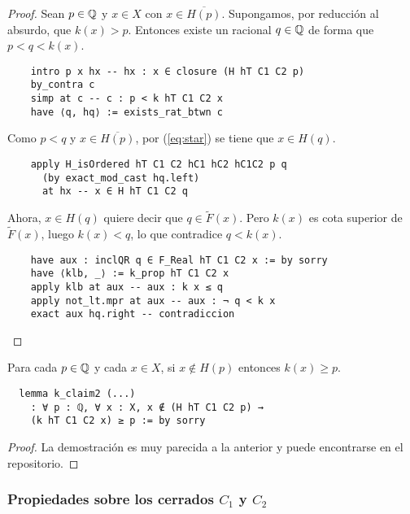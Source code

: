 \begin{proof}
  Sean $p \in \mathbb{Q}$ y $x \in X$ con $x \in \overline{H(p)}$. Supongamos, por reducción al absurdo, que $k(x) > p$. Entonces existe un racional $q \in \mathbb{Q}$ de forma que $p < q < k(x)$.

  \begin{lstlisting}
    intro p x hx -- hx : x ∈ closure (H hT C1 C2 p)
    by_contra c
    simp at c -- c : p < k hT C1 C2 x
    have ⟨q, hq⟩ := exists_rat_btwn c \end{lstlisting}

  Como $p < q$ y $x \in \overline{H(p)}$, por (\ref{eq:star}) se tiene que $x \in H(q)$. 

  \begin{lstlisting}
    apply H_isOrdered hT C1 C2 hC1 hC2 hC1C2 p q
      (by exact_mod_cast hq.left)
      at hx -- x ∈ H hT C1 C2 q \end{lstlisting}

  Ahora, $x \in H(q)$ quiere decir que $q \in \tilde{F}(x)$. Pero $k(x)$ es cota superior de $\tilde{F}(x)$, luego $k(x) < q$, lo que contradice $q < k(x)$.

  \begin{lstlisting}
    have aux : inclQR q ∈ F_Real hT C1 C2 x := by sorry
    have ⟨klb, _⟩ := k_prop hT C1 C2 x
    apply klb at aux -- aux : k x ≤ q
    apply not_lt.mpr at aux -- aux : ¬ q < k x
    exact aux hq.right -- contradiccion\end{lstlisting}
\end{proof}

\begin{lemma}\label{claim2}
  Para cada $p \in \mathbb{Q}$ y cada $x \in X$, si $x \notin H(p)$ entonces $k(x) \geq p$.
\end{lemma}

\begin{lstlisting}
  lemma k_claim2 (...)
    : ∀ p : ℚ, ∀ x : X, x ∉ (H hT C1 C2 p) →
    (k hT C1 C2 x) ≥ p := by sorry
\end{lstlisting}

\begin{proof}
  La demostración es muy parecida a la anterior y puede encontrarse en el repositorio.
\end{proof}

\subsubsection{Propiedades sobre los cerrados $C_1$ y $C_2$}

